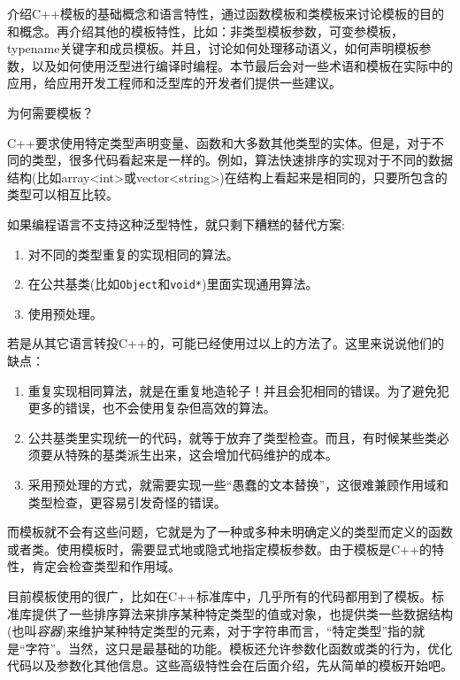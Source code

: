 

介绍C++模板的基础概念和语言特性，通过函数模板和类模板来讨论模板的目的和概念。再介绍其他的模板特性，比如：非类型模板参数，可变参模板，typename关键字和成员模板。并且，讨论如何处理移动语义，如何声明模板参数，以及如何使用泛型进行编译时编程。本节最后会对一些术语和模板在实际中的应用，给应用开发工程师和泛型库的开发者们提供一些建议。

\begin{flushleft}
 为何需要模板？
\end{flushleft}

C++要求使用特定类型声明变量、函数和大多数其他类型的实体。但是，对于不同的类型，很多代码看起来是一样的。例如，算法快速排序的实现对于不同的数据结构(比如array<int>或vector<string>)在结构上看起来是相同的，只要所包含的类型可以相互比较。

如果编程语言不支持这种泛型特性，就只剩下糟糕的替代方案:

\begin{enumerate}
\item 
对不同的类型重复的实现相同的算法。

\item 
在公共基类(比如\texttt{Object}和\texttt{void*})里面实现通用算法。

\item 
使用预处理。
\end{enumerate}

若是从其它语言转投C++的，可能已经使用过以上的方法了。这里来说说他们的缺点：

\begin{enumerate}
\item 
重复实现相同算法，就是在重复地造轮子！并且会犯相同的错误。为了避免犯更多的错误，也不会使用复杂但高效的算法。

\item 
公共基类里实现统一的代码，就等于放弃了类型检查。而且，有时候某些类必须要从特殊的基类派生出来，这会增加代码维护的成本。

\item 
采用预处理的方式，就需要实现一些“愚蠢的文本替换”，这很难兼顾作用域和类型检查，更容易引发奇怪的错误。
\end{enumerate}

而模板就不会有这些问题，它就是为了一种或多种未明确定义的类型而定义的函数或者类。使用模板时，需要显式地或隐式地指定模板参数。由于模板是C++的特性，肯定会检查类型和作用域。

目前模板使用的很广，比如在C++标准库中，几乎所有的代码都用到了模板。标准库提供了一些排序算法来排序某种特定类型的值或对象，也提供类一些数据结构(也叫\textit{容器})来维护某种特定类型的元素，对于字符串而言，“特定类型”指的就是“字符”。当然，这只是最基础的功能。模板还允许参数化函数或类的行为，优化代码以及参数化其他信息。这些高级特性会在后面介绍，先从简单的模板开始吧。










